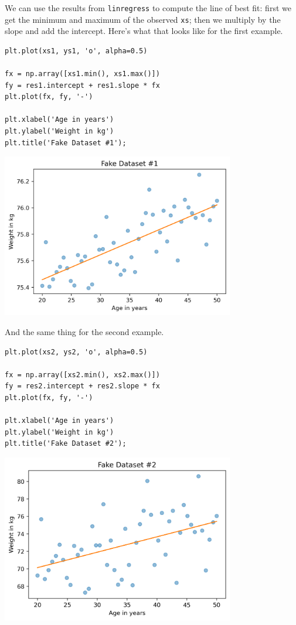 We can use the results from \passthrough{\lstinline!linregress!} to
compute the line of best fit: first we get the minimum and maximum of
the observed \passthrough{\lstinline!xs!}; then we multiply by the slope
and add the intercept. Here's what that looks like for the first
example.

\begin{lstlisting}[]
plt.plot(xs1, ys1, 'o', alpha=0.5)

fx = np.array([xs1.min(), xs1.max()])
fy = res1.intercept + res1.slope * fx
plt.plot(fx, fy, '-')

plt.xlabel('Age in years')
plt.ylabel('Weight in kg')
plt.title('Fake Dataset #1');
\end{lstlisting}

\begin{center}
\includegraphics[width=4in]{09_relationships_files/09_relationships_88_0.png}
\end{center}

And the same thing for the second example.

\begin{lstlisting}[]
plt.plot(xs2, ys2, 'o', alpha=0.5)

fx = np.array([xs2.min(), xs2.max()])
fy = res2.intercept + res2.slope * fx
plt.plot(fx, fy, '-')

plt.xlabel('Age in years')
plt.ylabel('Weight in kg')
plt.title('Fake Dataset #2');
\end{lstlisting}

\begin{center}
\includegraphics[width=4in]{09_relationships_files/09_relationships_90_0.png}
\end{center}


